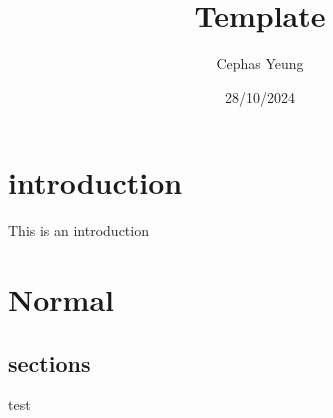\documentclass[twoside]{report}
\title{Template}
\author{Cephas Yeung}
\date{28/10/2024}
\begin{document}
\maketitle
\tableofcontents

\chapter*{introduction}
This is an introduction
\chapter{Normal}
\section{sections}
test



\end{document}

